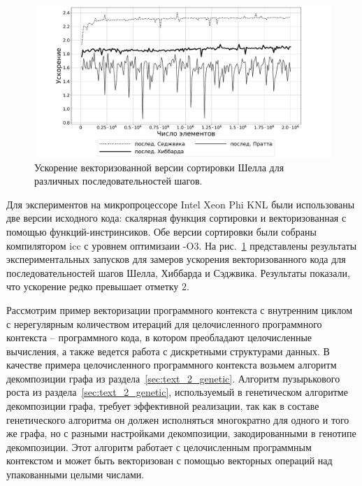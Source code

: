 \begin{figure}[ht]
\centering
\includegraphics[width=1.0\textwidth]{fig/vec_shell_experimental_eff.pdf}
\singlespacing
{}\caption{Ускорение векторизованной версии сортировки Шелла для различных последовательностей шагов.}
\label{fig:text_4_vec_irreg_eff}
\end{figure}

Для экспериментов на микропроцессоре Intel Xeon Phi KNL\label{abbr:knl-11} были использованы две версии исходного кода: скалярная функция сортировки и векторизованная с помощью функций-инстринсиков.
Обе версии сортировки были собраны компилятором icc с уровнем оптимизаии -O3.
На рис.~\ref{fig:text_4_vec_irreg_eff} представлены результаты экспериментальных запусков для замеров ускорения векторизованного кода для последовательностей шагов Шелла, Хиббарда и Сэджвика.
Результаты показали, что ускорение редко превышает отметку 2.


Рассмотрим пример векторизации программного контекста с внутренним циклом с нерегулярным количеством итераций для целочисленного программного контекста -- программного кода, в котором преобладают целочисленные вычисления, а также ведется работа с дискретными структурами данных.
В качестве примера целочисленного программного контекста возьмем алгоритм декомпозиции графа из раздела~\ref{sec:text_2_genetic}.
Алгоритм пузырькового роста из раздела~\ref{sec:text_2_genetic}, используемый в генетическом алгоритме декомпозиции графа, требует эффективной реализации, так как в составе генетического алгоритма он должен исполняться многократно для одного и того же графа, но с разными настройками декомпозиции, закодированными в генотипе декомпозиции.
Этот алгоритм работает с целочисленным программным контекстом и может быть векторизован с помощью векторных операций над упакованными целыми числами.

